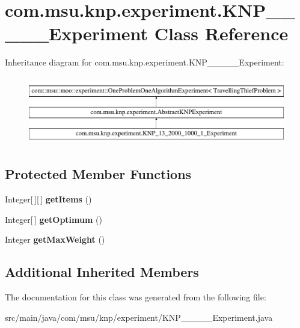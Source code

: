 \hypertarget{classcom_1_1msu_1_1knp_1_1experiment_1_1KNP__13__2000__1000__1__Experiment}{\section{com.\-msu.\-knp.\-experiment.\-K\-N\-P\-\_\-\_\-\_\-\_\-\_\-\-Experiment Class Reference}
\label{classcom_1_1msu_1_1knp_1_1experiment_1_1KNP__13__2000__1000__1__Experiment}
}
Inheritance diagram for com.\-msu.\-knp.\-experiment.\-K\-N\-P\-\_\-\_\-\_\-\_\-\_\-\-Experiment\-:\begin{figure}[H]
\begin{center}
\leavevmode
\includegraphics[height=3.000000cm]{classcom_1_1msu_1_1knp_1_1experiment_1_1KNP__13__2000__1000__1__Experiment}
\end{center}
\end{figure}
\subsection*{Protected Member Functions}
\begin{DoxyCompactItemize}
\item 
\hypertarget{classcom_1_1msu_1_1knp_1_1experiment_1_1KNP__13__2000__1000__1__Experiment_a2760560606091ba58ad566a0f6f6cb72}{Integer\mbox{[}$\,$\mbox{]}\mbox{[}$\,$\mbox{]} {\bfseries get\-Items} ()}\label{classcom_1_1msu_1_1knp_1_1experiment_1_1KNP__13__2000__1000__1__Experiment_a2760560606091ba58ad566a0f6f6cb72}

\item 
\hypertarget{classcom_1_1msu_1_1knp_1_1experiment_1_1KNP__13__2000__1000__1__Experiment_a090195441636600405c7d7cd3803cff3}{Integer\mbox{[}$\,$\mbox{]} {\bfseries get\-Optimum} ()}\label{classcom_1_1msu_1_1knp_1_1experiment_1_1KNP__13__2000__1000__1__Experiment_a090195441636600405c7d7cd3803cff3}

\item 
\hypertarget{classcom_1_1msu_1_1knp_1_1experiment_1_1KNP__13__2000__1000__1__Experiment_ae54f4f07c9e3d3e4c92651e96fb734ba}{Integer {\bfseries get\-Max\-Weight} ()}\label{classcom_1_1msu_1_1knp_1_1experiment_1_1KNP__13__2000__1000__1__Experiment_ae54f4f07c9e3d3e4c92651e96fb734ba}

\end{DoxyCompactItemize}
\subsection*{Additional Inherited Members}


The documentation for this class was generated from the following file\-:\begin{DoxyCompactItemize}
\item 
src/main/java/com/msu/knp/experiment/K\-N\-P\-\_\-\_\-\_\-\_\-\_\-\-Experiment.\-java\end{DoxyCompactItemize}
